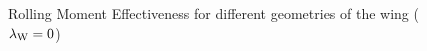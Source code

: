 \begin{figure}[H]
\centering
{}\\
\\
\caption[Rolling Moment Effectiveness for $\lambdaW = 0$] {Rolling Moment Effectiveness for different geometries of the wing ($\lambdaW = 0$)}
\label{rme0}
\end{figure}

